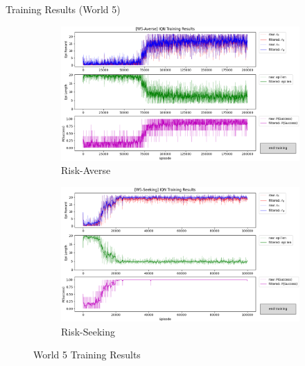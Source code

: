 \documentclass[aspectratio=1610, xcolor=dvipsnames]{packages/beamer}
\begin{document}
\begin{frame}{Training Results (World 5)}
     \begin{figure}
     \centering
         \begin{subfigure}[b]{\Wfig\textwidth} \centering
             \includegraphics[width=\textwidth]{../results/IDQN_W5/Fig_W5_JointQ_Averse}
             \caption{Risk-Averse} \label{fig:W5averse}
         \end{subfigure}
         \hfill
         \begin{subfigure}[b]{\Wfig\textwidth} \centering
             \includegraphics[width=\textwidth]{../results/IDQN_W5/Fig_W5_JointQ_Seeking}
             \caption{Risk-Seeking} \label{fig:W5seeking}
         \end{subfigure}
    \caption{World 5 Training Results}
    \label{fig:W5}
    \end{figure}
\end{frame}
\end{document}
